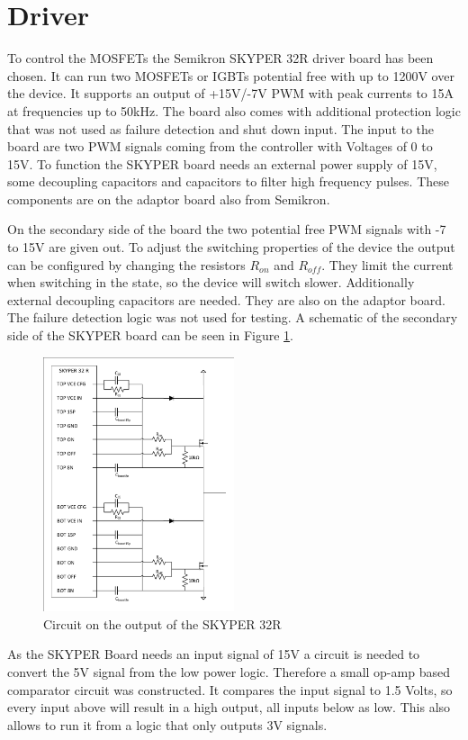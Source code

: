 \vspace{-8mm}
\section{Driver}\label{sec:driver}
\vspace{-3mm}
To control the MOSFETs the Semikron SKYPER 32R driver board has been chosen. \cite{Board1SK17:online} It can run two MOSFETs or IGBTs potential free with up to 1200V over the device.
It supports an output of +15V/-7V PWM with peak currents to 15A at frequencies up to 50kHz.
The board also comes with additional protection logic that was not used as failure detection and shut down input.
The input to the board are two PWM signals coming from the controller with Voltages of 0 to 15V.
To function the SKYPER board needs an external power supply of 15V,
some decoupling capacitors and capacitors to filter high frequency pulses.
These components are on the adaptor board also from Semikron.

On the secondary side of the board the two potential free PWM signals with -7 to 15V are given out.\cite{SKYPER322:online}
To adjust the switching properties of the device the output can be configured by changing the resistors $R_{on}$ and $R_{off}$.
They limit the current when switching in the state, so the device will switch slower.
Additionally external decoupling capacitors are needed. They are also on the adaptor board.
The failure detection logic was not used for testing.
A schematic of the secondary side of the SKYPER board can be seen in Figure \ref{fig:Skyper32out}.

\begin{figure}[H]
   \centering
   \includegraphics[width=0.5\textwidth]{figures/Skyperboard/Skyper32out.pdf}
    \caption{Circuit on the output of the SKYPER 32R}
	\label{fig:Skyper32out}
\end{figure}
\clearpage
As the SKYPER Board needs an input signal of 15V a circuit is needed to convert the 5V signal from the low power logic.
Therefore a small op-amp based comparator circuit was constructed.
It compares the input signal to 1.5 Volts, so every input above will result in a high output,
all inputs below as low.
This also allows to run it from a logic that only outputs 3V signals.


